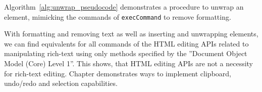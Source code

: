 Algorithm~\ref{alg:unwrap_pseudocode} demonstrates a procedure to unwrap an element, mimicking the commands of \texttt{execCommand} to remove formatting.

With formatting and removing text as well as inserting and unwrapping elements, we can find equivalents for all commands of the HTML editing APIs related to manipulating rich-text using only methods specified by the ''Document Object Model (Core) Level 1''. This shows, that HTML editing APIs are not a necessity for rich-text editing. Chapter  demonstrates ways to implement clipboard, undo/redo and selection capabilities.



